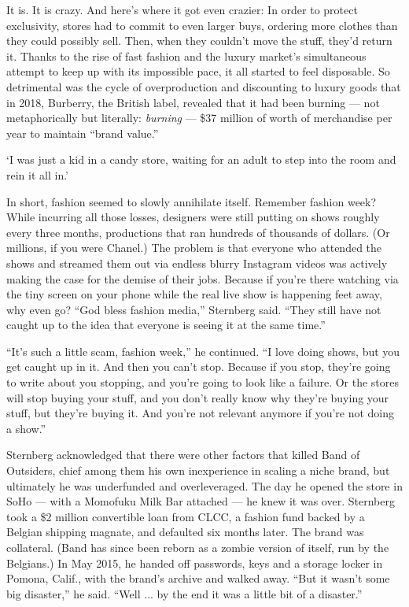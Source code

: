 It is. It is crazy. And here's where it got even crazier: In order to
protect exclusivity, stores had to commit to even larger buys, ordering
more clothes than they could possibly sell. Then, when they couldn't
move the stuff, they'd return it. Thanks to the rise of fast fashion and
the luxury market's simultaneous attempt to keep up with its impossible
pace, it all started to feel disposable. So detrimental was the cycle of
overproduction and discounting to luxury goods that in 2018, Burberry,
the British label, revealed that it had been burning --- not
metaphorically but literally: \emph{burning} --- \$37 million of worth
of merchandise per year to maintain ``brand value.''

`I was just a kid in a candy store, waiting for an adult to step into
the room and rein it all in.'

In short, fashion seemed to slowly annihilate itself. Remember fashion
week? While incurring all those losses, designers were still putting on
shows roughly every three months, productions that ran hundreds of
thousands of dollars. (Or millions, if you were Chanel.) The problem is
that everyone who attended the shows and streamed them out via endless
blurry Instagram videos was actively making the case for the demise of
their jobs. Because if you're there watching via the tiny screen on your
phone while the real live show is happening feet away, why even go?
``God bless fashion media,'' Sternberg said. ``They still have not
caught up to the idea that everyone is seeing it at the same time.''

``It's such a little scam, fashion week,'' he continued. ``I love doing
shows, but you get caught up in it. And then you can't stop. Because if
you stop, they're going to write about you stopping, and you're going to
look like a failure. Or the stores will stop buying your stuff, and you
don't really know why they're buying your stuff, but they're buying it.
And you're not relevant anymore if you're not doing a show.''

Sternberg acknowledged that there were other factors that killed Band of
Outsiders, chief among them his own inexperience in scaling a niche
brand, but ultimately he was underfunded and overleveraged. The day he
opened the store in SoHo --- with a Momofuku Milk Bar attached --- he
knew it was over. Sternberg took a \$2 million convertible loan from
CLCC, a fashion fund backed by a Belgian shipping magnate, and defaulted
six months later. The brand was collateral. (Band has since been reborn
as a zombie version of itself, run by the Belgians.) In May 2015, he
handed off passwords, keys and a storage locker in Pomona, Calif., with
the brand's archive and walked away. ``But it wasn't some big
disaster,'' he said. ``Well ... by the end it was a little bit of a
disaster.''

